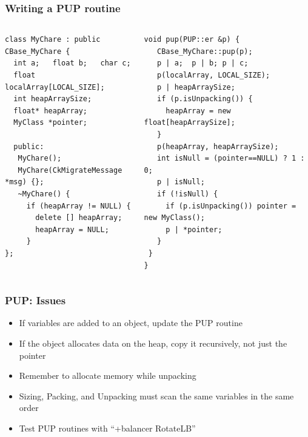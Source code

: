 \begin{frame}[fragile]
\frametitle{Writing a PUP routine}
 \begin{columns}
 \begin{column}{0.5\textwidth}
   \begin{lstlisting}
class MyChare : public CBase_MyChare {
  int a;   float b;   char c;
  float localArray[LOCAL_SIZE];
  int heapArraySize;
  float* heapArray;
  MyClass *pointer;
 
  public:
   MyChare();
   MyChare(CkMigrateMessage *msg) {};
   ~MyChare() {
     if (heapArray != NULL) {
       delete [] heapArray;
       heapArray = NULL;
     }
};
 \end{lstlisting}
 \end{column}
 \begin{column}{0.5\textwidth}
  \begin{lstlisting}
void pup(PUP::er &p) {
   CBase_MyChare::pup(p);
   p | a;  p | b; p | c;
   p(localArray, LOCAL_SIZE);
   p | heapArraySize;
   if (p.isUnpacking()) {
     heapArray = new float[heapArraySize];
   }
   p(heapArray, heapArraySize);
   int isNull = (pointer==NULL) ? 1 : 0;
   p | isNull;
   if (!isNull) {
     if (p.isUnpacking()) pointer = new MyClass();
     p | *pointer;
   }
 }
}
  \end{lstlisting}
  \end{column}
  \end{columns}
\end{frame}

\begin{frame}[fragile]
\frametitle{PUP: Issues}
\begin{itemize}
\item If variables are added to an object, update the PUP routine
\item If the object allocates data on the heap, copy it recursively, not just the pointer
\item Remember to allocate memory while unpacking
\item Sizing, Packing, and Unpacking must scan the same variables in the same order
\item Test PUP routines with “+balancer RotateLB”
\end{itemize}
\end{frame}
